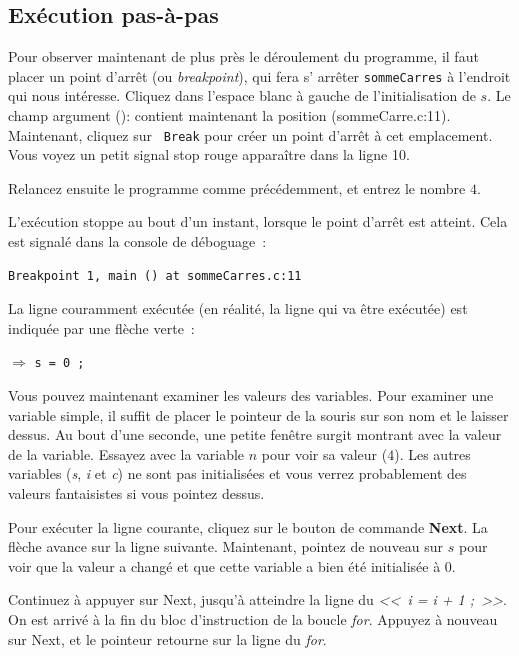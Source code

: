 \documentclass[12pt,a4paper]{article}
\begin{document}
\subsection{Exécution pas-à-pas}

Pour observer maintenant de plus près le déroulement du programme,
il faut placer un point d’arrêt (ou \emph{breakpoint}), qui fera s’
arrêter {\tt sommeCarres} à l’endroit qui nous intéresse. Cliquez
dans l’espace blanc à 
gauche de l’initialisation de $s$. Le champ argument (): contient
maintenant la position (sommeCarre.c:11). Maintenant, cliquez sur {\tt
  Break} pour créer un point d’arrêt à cet emplacement. Vous voyez un
petit signal stop rouge apparaître dans la ligne 10. 

\bigskip

Relancez ensuite le programme comme précédemment, et entrez le nombre
$4$.


L'exécution stoppe au bout d'un instant, lorsque le point d'arrêt
est atteint. Cela est signalé dans la console de déboguage~:

\begin{verbatim}
Breakpoint 1, main () at sommeCarres.c:11
\end{verbatim}

La ligne couramment exécutée (en réalité, la ligne qui va être
exécutée) est indiquée par une flèche verte~:

$\Rightarrow$ \lstinline{s = 0 ;}

\bigskip

Vous pouvez maintenant examiner les valeurs des variables. Pour
examiner une variable simple, il suffit de placer le pointeur de la
souris sur son nom et le laisser dessus. Au bout d’une seconde, une
petite fenêtre surgit montrant avec la valeur de la variable. Essayez
avec la variable $n$ pour voir sa valeur ($4$). Les autres variables
(\textit{s}, \textit{i} et \textit{c}) ne sont pas initialisées et
vous verrez probablement des valeurs
fantaisistes si vous pointez dessus.


Pour exécuter la ligne courante, cliquez sur le bouton de commande
{\bf Next}. La flèche avance sur la ligne suivante. Maintenant,
pointez de nouveau sur $s$ pour voir que la valeur a changé et que cette
variable a bien été initialisée à $0$.

Continuez à appuyer sur Next, jusqu'à atteindre la ligne du
\emph{<<~i = i + 1 ;~>>}. On est arrivé à la fin du bloc d'instruction
de la boucle \textit{for}. Appuyez à nouveau sur Next, et le pointeur
retourne sur la ligne du \textit{for}.
\end{document}
